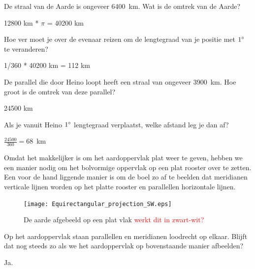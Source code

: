 \begin{opgave}
	\begin{subopgave}
		De straal van de Aarde is ongeveer 6400~km. Wat is de omtrek van de Aarde?
		\begin{antwoord}
			12800 km * $\pi$ = 40200 km
		\end{antwoord}			
	\end{subopgave}
	\begin{subopgave}
		Hoe ver moet je over de evenaar reizen om de lengtegraad van je positie met $1\degree$ te veranderen?
		\begin{antwoord}
			1/360 * 40200 km = 112 km
		\end{antwoord}
	\end{subopgave}
	\begin{subopgave}
		De parallel die door Heino loopt heeft een straal van ongeveer 3900~km. Hoe groot is de omtrek van deze parallel?
		\begin{antwoord}
			24500 km
		\end{antwoord}
	\end{subopgave}
	\begin{subopgave}
		Als je vanuit Heino $1\degree$ lengtegraad verplaatst, welke afstand leg je dan af?
		\begin{antwoord}
			$\frac{24500}{360} = 68$~km
		\end{antwoord}
	\end{subopgave}
\end{opgave}

Omdat het makkelijker is om het aardoppervlak plat weer te geven, hebben we een manier nodig om het bolvormige oppervlak op een plat rooster over te zetten. Een voor de hand liggende manier is om de boel zo af te beelden dat meridianen verticale lijnen worden op het platte rooster en parallellen horizontale lijnen.

\begin{figure}[h]
	\centering
	\texttt{[image: Equirectangular\_projection\_SW.eps]}
	\caption{De aarde afgebeeld op een plat vlak \textcolor{red}{werkt dit in zwart-wit?}}
	\label{fig_equirect}
\end{figure}

\begin{opgave}
	Op het aardoppervlak staan parallellen en meridianen loodrecht op elkaar. Blijft dat nog steeds zo als we het aardoppervlak op bovenstaande manier afbeelden?
	\begin{antwoord}
		Ja.
	\end{antwoord}
\end{opgave}


